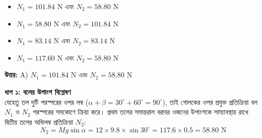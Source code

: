 \documentclass[12pt, a4paper]{article}
\begin{document}
{{\begin{center}
\end{center}
\vspace{1em}

\begin{itemize}[label={}, leftmargin=1cm, itemsep=0.5em]
    \item[\textbf{A)}] $N_1 = 101.84\text{ N}$ এবং $N_2 = 58.80\text{ N}$
    \item[\textbf{B)}] $N_1 = 58.80\text{ N}$ এবং $N_2 = 101.84\text{ N}$
    \item[\textbf{C)}] $N_1 = 83.14\text{ N}$ এবং $N_2 = 83.14\text{ N}$
    \item[\textbf{D)}] $N_1 = 117.60\text{ N}$ এবং $N_2 = 58.80\text{ N}$
\end{itemize}

\vspace{0.5em}
\begin{tcolorbox}[answerbox]
    \textbf{\color{success} উত্তর:} A) $N_1 = 101.84\text{ N}$ এবং $N_2 = 58.80\text{ N}$
\end{tcolorbox}
\vspace{1em}

\begin{tcolorbox}[solutionbox={সমাধান (Solution)}]
    \noindent
    \textbf{ধাপ ১: বলের উপাংশ বিশ্লেষণ} \\
    যেহেতু তল দুটি পরস্পরের ওপর লম্ব ($\alpha + \beta = 30^\circ + 60^\circ = 90^\circ$), তাই গোলকের ওপর প্রযুক্ত প্রতিক্রিয়া বল $N_1$ ও $N_2$ পরস্পরের সমকোণে ক্রিয়া করে। 
    প্রথম তলের সমান্তরাল বরাবর ওজনের উপাংশকে সাম্যাবস্থায় রাখে দ্বিতীয় তলের অভিলম্ব প্রতিক্রিয়া $N_2$:
    \[ N_2 = M g \sin\alpha = 12 \times 9.8 \times \sin 30^\circ = 117.6 \times 0.5 = \mathbf{58.80}\text{ N} \]
    

\end{tcolorbox}}}
\end{document}
